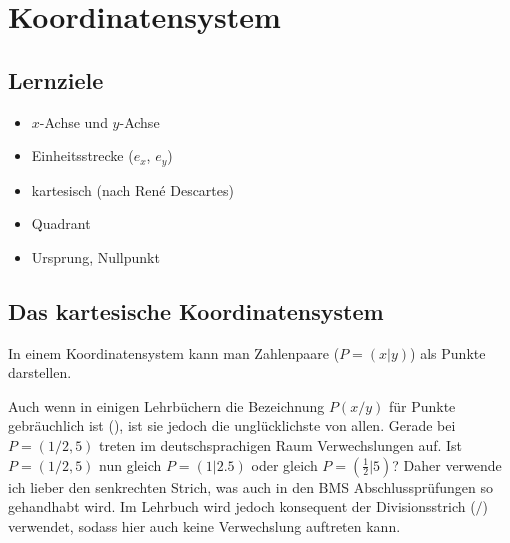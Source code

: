 
\section{Koordinatensystem}
\subsection*{Lernziele}

\begin{itemize}
\item $x$-Achse und $y$-Achse
\item Einheitsstrecke ($e_x$, $e_y$)
\item kartesisch (nach René Descartes)
\item Quadrant 
\item Ursprung, Nullpunkt
\end{itemize}


\subsection{Das kartesische Koordinatensystem}
In einem Koordinatensystem kann man Zahlenpaare ($P=(x|y)$) als Punkte
darstellen.

\begin{bemerkung}{}{}
  Auch wenn in einigen Lehrbüchern die Bezeichnung $P(x/y)$ für Punkte gebräuchlich ist (\cite{frommenwiler17alg}), ist
  sie jedoch die unglücklichste von allen. Gerade bei $P=(1/2,5)$
  treten im deutschsprachigen Raum Verwechslungen auf. Ist $P=(1/2,5)$
  nun gleich $P=(1 | 2.5)$ oder gleich $P=(\frac{1}{2} | 5)$?
  Daher verwende ich lieber den senkrechten Strich, was auch in den
  BMS Abschlussprüfungen so gehandhabt wird. Im Lehrbuch wird jedoch
  konsequent der Divisionsstrich ($/$) verwendet, sodass hier auch
  keine Verwechslung auftreten kann.
\end{bemerkung}
\newpage

